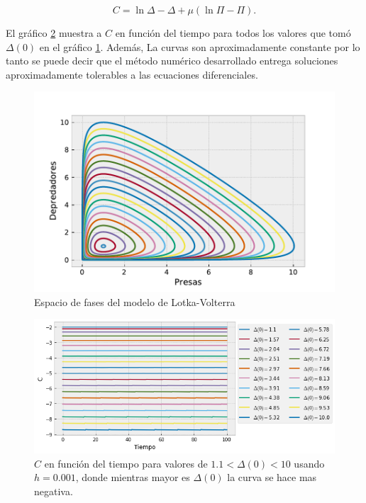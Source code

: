 \documentclass[../portafolio.tex]{subfiles}
\begin{document}
\begin{equation}
    C=\ln{\Delta}-\Delta + \mu (\ln{\Pi}-\Pi). \label{cteLV}
\end{equation}

El gráfico \ref{graf3LV} muestra a $C$ en función del tiempo para todos los valores que tomó $\Delta(0)$ en el gráfico \ref{graf2LV}. Además, La curvas son aproximadamente constante por lo tanto se puede decir que el método numérico desarrollado entrega soluciones aproximadamente tolerables a las ecuaciones diferenciales.

\begin{figure}
    \centering
    \includegraphics[scale=0.85]{tex/img/edo-ej-d.pdf}
    \caption{Espacio de fases del modelo de Lotka-Volterra}
    \label{graf2LV}
\end{figure}




\begin{figure}
    \centering
    \includegraphics[scale=0.8]{tex/img/edo-ej-e.png}
    \caption{$C$ en función del tiempo para valores de $1.1<\Delta(0)<10$ usando $h=0.001$, donde mientras mayor es $\Delta(0)$ la curva se hace mas negativa.}
    \label{graf3LV}
\end{figure}
\end{document}
